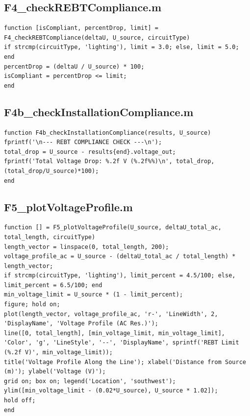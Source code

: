 \documentclass[12pt, a4paper]{article}
\begin{document}
\subsection{F4\_checkREBTCompliance.m}
\begin{lstlisting}[caption={Checks if a single line's voltage drop complies with REBT limits.}, label={lst:F4}]
function [isCompliant, percentDrop, limit] = F4_checkREBTCompliance(deltaU, U_source, circuitType)
if strcmp(circuitType, 'lighting'), limit = 3.0; else, limit = 5.0; end
percentDrop = (deltaU / U_source) * 100;
isCompliant = percentDrop <= limit;
end
\end{lstlisting}

\subsection{F4b\_checkInstallationCompliance.m}
\begin{lstlisting}[caption={Checks a multi-segment installation against tiered REBT limits.}, label={lst:F4b}]
function F4b_checkInstallationCompliance(results, U_source)
fprintf('\n--- REBT COMPLIANCE CHECK ---\n');
total_drop = U_source - results{end}.voltage_out;
fprintf('Total Voltage Drop: %.2f V (%.2f%%)\n', total_drop, (total_drop/U_source)*100);
end
\end{lstlisting}

\subsection{F5\_plotVoltageProfile.m}
\begin{lstlisting}[caption={Plots the voltage profile for a single line.}, label={lst:F5}]
function [] = F5_plotVoltageProfile(U_source, deltaU_total_ac, total_length, circuitType)
length_vector = linspace(0, total_length, 200);
voltage_profile_ac = U_source - (deltaU_total_ac / total_length) * length_vector;
if strcmp(circuitType, 'lighting'), limit_percent = 4.5/100; else, limit_percent = 6.5/100; end
min_voltage_limit = U_source * (1 - limit_percent);
figure; hold on;
plot(length_vector, voltage_profile_ac, 'r-', 'LineWidth', 2, 'DisplayName', 'Voltage Profile (AC Res.)');
line([0, total_length], [min_voltage_limit, min_voltage_limit], 'Color', 'g', 'LineStyle', '--', 'DisplayName', sprintf('REBT Limit (%.2f V)', min_voltage_limit));
title('Voltage Profile Along the Line'); xlabel('Distance from Source (m)'); ylabel('Voltage (V)');
grid on; box on; legend('Location', 'southwest');
ylim([min_voltage_limit - (0.02*U_source), U_source * 1.02]);
hold off;
end
\end{lstlisting}
\end{document}
